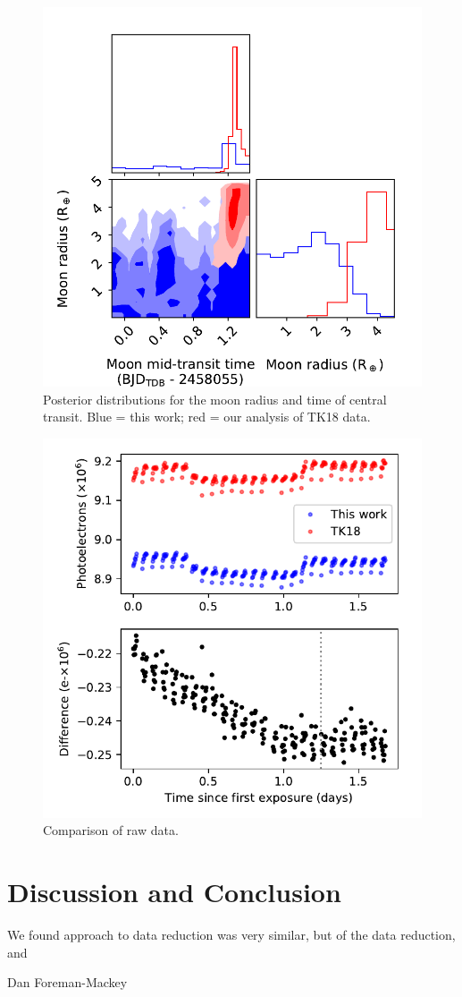 \documentclass[twocolumn]{aastex62}
\begin{document}
\begin{figure}
\includegraphics[width = 0.5 \textwidth]{figures/fig5_pairs.pdf}
    \caption{Posterior distributions for the moon radius and time of central transit. Blue = this work; red = our analysis of TK18 data.}
\label{fig:corner}
\end{figure}


\begin{figure}
\includegraphics[width = 0.5 \textwidth]{figures/fig6_rawdata.pdf}
    \caption{Comparison of raw data.}
\label{fig:raw}
\end{figure}

\section{Discussion and Conclusion}
We found
approach to data reduction was very similar, but of the data reduction, and 


\acknowledgments
Dan Foreman-Mackey
\end{document}
